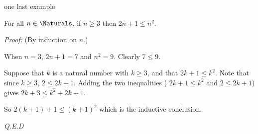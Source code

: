 \documentclass[handout,landscape]{beamer}
\begin{document}
\begin{frame}{one last example}
\begin{thm*}
For all $n \in \Naturals$, if $n \geq 3$ then $2n+1 \leq n^2$.
\end{thm*}
\pause

{\em Proof:} (By induction on $n$.) \pause

 When $n=3$, $2n+1 = 7$ and $n^2 = 9$. Clearly $7 \leq 9$. \pause

 Suppose that $k$ is a natural number 
with $k \geq 3$, and that $2k+1 \leq k^2$. \pause Note that since $k \geq 3$, $2 \leq 2k+1$. \pause
Adding the two inequalities ( $2k+1 \leq k^2$ and $2 \leq 2k+1$) gives $2k+3 \leq k^2 + 2k + 1$. \pause

So $2(k+1)+1 \leq (k+1)^2$ which is the inductive conclusion. \pause

\hfill {\em Q.E.D} 

\end{frame}
\end{document}
